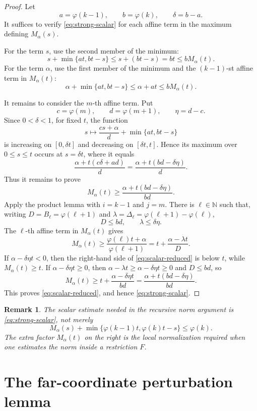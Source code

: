 \documentclass[11pt]{article}
\newtheorem{remark}[theorem]{Remark}
\newcommand{\N}{\mathbb N}
\newcommand{\ph}{\varphi}
\begin{document}
\begin{proof}
Let
\[
 a=\ph(k-1),\qquad b=\ph(k),\qquad \delta=b-a.
\]
It suffices to verify \eqref{eq:strong-scalar} for each affine term in the maximum defining
$M_\alpha(s)$.

For the term $s$, use the second member of the minimum:
\[
 s+\min\{at,bt-s\}\le s+(bt-s)=bt\le bM_\alpha(t).
\]
For the term $\alpha$, use the first member of the minimum and the $(k-1)$-st affine term in
$M_\alpha(t)$:
\[
 \alpha+\min\{at,bt-s\}\le \alpha+at
 \le bM_\alpha(t).
\]

It remains to consider the $m$-th affine term.  Put
\[
 c=\ph(m),\qquad d=\ph(m+1),\qquad \eta=d-c.
\]
Since $0<\delta<1$, for fixed $t$, the function
\[
 s\mapsto \frac{cs+\alpha}{d}+\min\{at,bt-s\}
\]
is increasing on $[0,\delta t]$ and decreasing on $[\delta t,t]$.  Hence its maximum over
$0\le s\le t$ occurs at $s=\delta t$, where it equals
\[
 \frac{\alpha+t(c\delta+ad)}{d}
 =\frac{\alpha+t(bd-\delta\eta)}{d}.
\]
Thus it remains to prove
\begin{equation}
 M_\alpha(t)\ge
 \frac{\alpha+t(bd-\delta\eta)}{bd}.
 \label{eq:scalar-reduced}
\end{equation}
Apply the product lemma with $i=k-1$ and $j=m$.  There is $\ell\in\N$ such that, writing
$D=B_\ell=\ph(\ell+1)$ and $\lambda=\Delta_\ell=\ph(\ell+1)-\ph(\ell)$,
\[
 D\le bd,
 \qquad
 \lambda\le \delta\eta.
\]
The $\ell$-th affine term in $M_\alpha(t)$ gives
\[
 M_\alpha(t)
 \ge \frac{\ph(\ell)t+\alpha}{\ph(\ell+1)}
 =t+\frac{\alpha-\lambda t}{D}.
\]
If $\alpha-\delta\eta t<0$, then the right-hand side of \eqref{eq:scalar-reduced} is below
$t$, while $M_\alpha(t)\ge t$.  If $\alpha-\delta\eta t\ge 0$, then $\alpha-\lambda t\ge
\alpha-\delta\eta t\ge 0$ and $D\le bd$, so
\[
 M_\alpha(t)
 \ge t+\frac{\alpha-\delta\eta t}{bd}
 =\frac{\alpha+t(bd-\delta\eta)}{bd}.
\]
This proves \eqref{eq:scalar-reduced}, and hence \eqref{eq:strong-scalar}.
\end{proof}

\begin{remark}
The scalar estimate needed in the recursive norm argument is \eqref{eq:strong-scalar}, not merely
\[
 M_\alpha(s)+\min\{\ph(k-1)t,\ph(k)t-s\}\le \ph(k).
\]
The extra factor $M_\alpha(t)$ on the right is the local normalization required when one estimates
the norm inside a restriction $F$.
\end{remark}

\section{The far-coordinate perturbation lemma}
\end{document}
